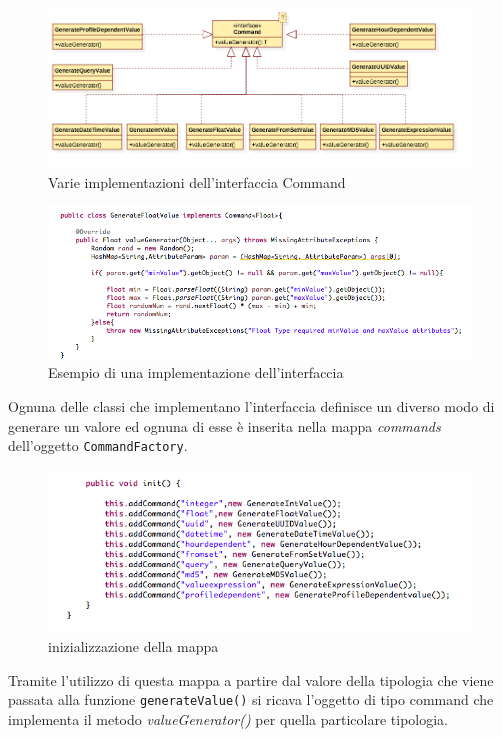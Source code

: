 \documentclass[12pt,a4paper,italian]{article}
\begin{document}
		\newpage
		\begin{figure}[h!]
			\centering
			\includegraphics[width=14cm]{img/command.png}
			\caption{Varie implementazioni dell'interfaccia Command}\label{command}
		\end{figure}
		
		
		\begin{figure}[h!]
			\centering
			\includegraphics[width=14cm]{img/generatefloatvalue.png}
			\caption{Esempio di una implementazione dell'interfaccia}\label{floatValue}
		\end{figure}
		
		Ognuna delle classi che implementano l'interfaccia definisce un diverso modo di generare un valore ed ognuna di esse è inserita nella mappa \emph{commands} dell'oggetto \texttt{CommandFactory}.
		\newpage
			\begin{figure}[h!]
				\centering
				\includegraphics[height=4.3cm]{img/init.png}
				\caption{inizializzazione della mappa}\label{init}
			\end{figure}
		
		
		Tramite l'utilizzo di questa mappa a partire dal valore della tipologia che viene passata alla funzione \texttt{generateValue()} si ricava l'oggetto di tipo command che implementa il metodo \emph{valueGenerator()} per quella particolare tipologia.
\newpage
\appendix
\end{document}
